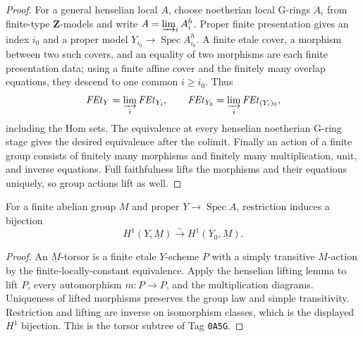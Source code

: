 \begin{proof}
For a general henselian local $A$, choose noetherian local G-rings $A_i$ from
finite-type $\mathbf Z$-models and write
$A=\varinjlim_iA_i^h$.  Proper finite presentation gives an index $i_0$ and
a proper model $Y_{i_0}\to\operatorname{Spec}A_{i_0}^h$.  A finite etale
cover, a morphism between two such covers, and an equality of two morphisms
are each finite presentation data; using a finite affine cover and the
finitely many overlap equations, they descend to one common $i\geq i_0$.
Thus
\[
 \mathit{FEt}_Y=\varinjlim_i\mathit{FEt}_{Y_i},\qquad
 \mathit{FEt}_{Y_0}=\varinjlim_i\mathit{FEt}_{(Y_i)_0},
\]
including the Hom sets.  The equivalence at every henselian noetherian
G-ring stage gives the desired equivalence after the colimit.  Finally an
action of a finite group consists of finitely many morphisms and finitely
many multiplication, unit, and inverse equations.  Full faithfulness lifts
the morphisms and their equations uniquely, so group actions lift as well.
\end{proof}

\begin{lemma}
\label{lemma:weil-pbc-h1-torsor-comparison}
For a finite abelian group $M$ and proper $Y\to\operatorname{Spec}A$,
restriction induces a bijection
\[
 H^1(Y,\underline M)\xrightarrow{\sim}H^1(Y_0,\underline M).
\]
\end{lemma}
\begin{proof}

An $\underline M$-torsor is a finite etale $Y$-scheme $P$ with a simply
transitive $M$-action by the finite-locally-constant equivalence.  Apply the
henselian lifting lemma to lift $P$, every automorphism $m:P\to P$, and the
multiplication diagrams.  Uniqueness of lifted morphisms preserves the group
law and simple transitivity.  Restriction and lifting are inverse on
isomorphism classes, which is the displayed $H^1$ bijection.  This is the
torsor subtree of Tag \texttt{0A5G}.
\end{proof}

